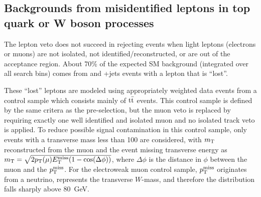 \subsection{Backgrounds from misidentified leptons in top quark or W boson processes}
\label{sec:wtop}


The lepton veto does not succeed in rejecting events when light leptons (electrons or muons) are not isolated, not identified/reconstructed, or are out of the acceptance region. 
%
About 70\% of the expected SM background (integrated over all search bins) comes from \ttbar and {\PW}+jets events with a lepton that is ``lost''.  

These ``lost'' leptons are modeled using appropriately weighted data events from a control sample which consists mainly of ${\rm t\bar{t}}$ events. 
%
This control sample is defined by the same critera as the pre-selection, but the muon veto is replaced by requiring exactly one well identified and isolated muon and no isolated track veto is applied.
%
To reduce possible signal contamination in this control sample, only events with a transverse mass less than 100 \gev are considered, with $m_{\rm T}$ reconstructed from the muon \pt and the event missing transverse energy as $m_{\rm T} = \sqrt{2 p_{\rm T}(\mu) E^{\rm miss}_{\rm T} (1 - \cos(\Delta \phi))}$, where $\Delta \phi$ is the distance in $\phi$ between the muon and the $p^{\rm miss}_{\rm T}$. 
%
For the electroweak muon control sample, $p^{\rm miss}_{\rm T}$ originates from a neutrino, \mt represents the transverse $W$-mass, and therefore the distribution falls sharply above $80$~GeV.

